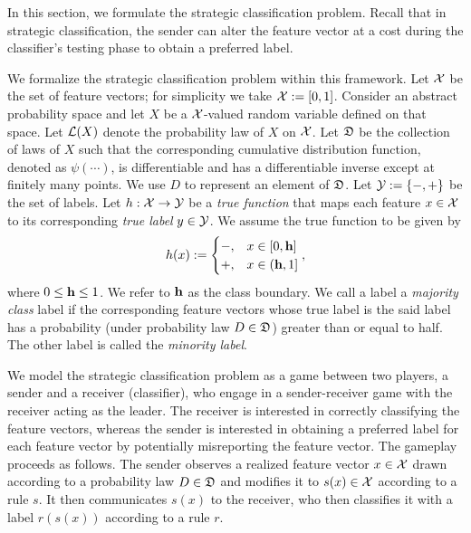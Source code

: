 In this section, we formulate the strategic classification problem. Recall that in strategic classification, the sender can alter the feature vector at a cost during the classifier's testing phase to obtain a preferred label.

We formalize the strategic classification problem within this framework. Let $\mathcal{X}$ be the set of feature vectors; for simplicity we take $\mathcal{X}:= [0,1]$. Consider an abstract probability space and let $X$ be a $\mathcal{X}$-valued random variable defined on that space. Let $\mathcal{L}(X)$ denote the probability law of $X$ on  $\mathcal{X}$. Let $\mathfrak{D}$ be the collection of laws of $X$ such that the corresponding cumulative distribution function, denoted as $\psi(\cdots)$, is differentiable and has a differentiable inverse except at finitely many points.
We use $D$ to represent an element of $\mathfrak{D}$. Let $\mathcal{Y} :=\{-,+\}$ be the set of labels. Let $h: \mathcal{X} \rightarrow \mathcal{Y}$ be a \textit{true function} that maps each feature $x \in \mathcal{X}$ to its corresponding \textit{true label} $y \in \mathcal{Y}$. We assume the true function to be given by
\begin{equation}\label{eqn:True function}
	h(x) := \begin{cases}
		\mathbf{-}, & x \in [0,\mathbf{h}] \\
		\mathbf{+}, & x \in (\mathbf{h},1]
	\end{cases},
\end{equation}
where $0 \leq \mathbf{h} \leq 1$. We refer to $\mathbf{h}$ as the class boundary. We call a label a \textit{majority class} label if the corresponding feature vectors whose true label is the said label has a probability (under probability law $D \in \mathfrak{D}$) greater than or equal to half. The other label is called the \textit{minority label}.

We model the strategic classification problem  as a game between two players, a sender and a receiver (classifier), who engage in a sender-receiver game with the receiver acting as the leader. The receiver is interested in correctly classifying  the feature vectors, whereas the sender is interested in obtaining a preferred label for each feature vector by potentially misreporting the feature vector. The gameplay proceeds as follows. The sender observes a realized feature vector $x\in \mathcal{X}$ drawn according to a probability law $D \in \mathfrak{D}$ and modifies it to $s(x) \in \mathcal{X}$ according to a rule $s$. It then communicates $s(x)$ to the receiver, who then classifies it with a label $r(s(x))$ according to a rule $r$.

